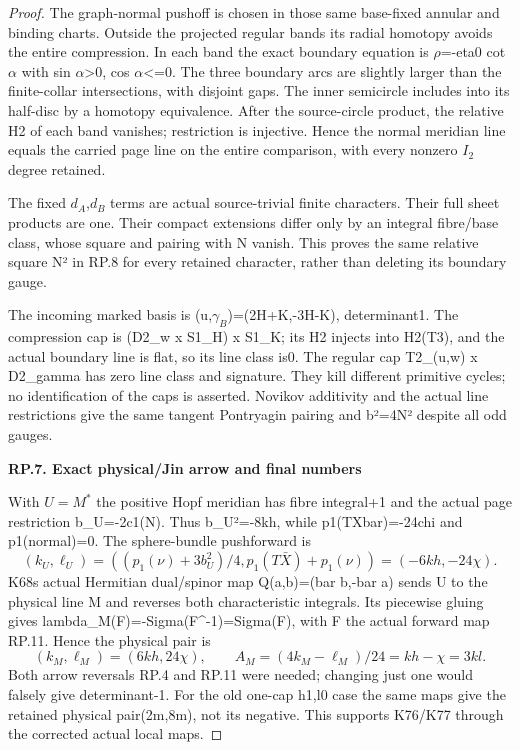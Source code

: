 \begin{proof}
The graph-normal pushoff is chosen in those same base-fixed annular
and binding charts. Outside the projected regular bands its radial
homotopy avoids the entire compression. In each band the exact boundary
equation is \(\rho\)=-eta0 cot \(\alpha\) with sin \(\alpha\)\textgreater0, cos \(\alpha\)\textless=0. The
three boundary arcs are slightly larger than the finite-collar
intersections, with disjoint gaps. The inner semicircle includes into
its half-disc by a homotopy equivalence. After the source-circle product,
the relative H2 of each band vanishes; restriction is injective. Hence
the normal meridian line equals the carried page line on the entire
comparison, with every nonzero \(I_2\) degree retained.

The fixed \(d_A\),\(d_B\) terms are actual source-trivial finite characters.
Their full sheet products are one. Their compact extensions differ
only by an integral fibre/base class, whose square and pairing with
N vanish. This proves the same relative square N² in RP.8 for every
retained character, rather than deleting its boundary gauge.

The incoming marked basis is (u,\(\gamma_B\))=(2H+K,-3H-K), determinant1.
The compression cap is (D2\_w x S1\_H) x S1\_K; its H2 injects into
H2(T3), and the actual boundary line is flat, so its line class is0.
The regular cap T2\_(u,w) x D2\_gamma has zero line class and signature.
They kill different primitive cycles; no identification of the caps
is asserted. Novikov additivity and the actual line restrictions give
the same tangent Pontryagin pairing and b²=4N² despite all odd gauges.

\par

\medskip\noindent\textbf{RP.7. Exact physical/Jin arrow and final numbers}

\par\nobreak

With \(U=M^*\) the positive Hopf meridian has fibre integral+1 and the
actual page restriction b\_U=-2c1(N). Thus b\_U²=-8kh, while
p1(TXbar)=-24chi and p1(normal)=0. The sphere-bundle pushforward is
\[
(k_U,\ell_U)=((p_1(\nu)+3b_U^2)/4, p_1(T\bar X)+p_1(\nu))
                  =(-6kh,-24\chi).
\tag{RP.19}
\]
K68\textquotesingle s actual Hermitian dual/spinor map Q(a,b)=(bar b,-bar a) sends
U to the physical line M and reverses both characteristic integrals.
Its piecewise gluing gives lambda\_M(F)=-Sigma(F\^{}-1)=Sigma(F), with F
the actual forward map RP.11. Hence the physical pair is
\[
(k_M,\ell_M)=(6kh,24\chi),\qquad
A_M=(4k_M-\ell_M)/24=kh-\chi=3kl.
\tag{RP.20}
\]
Both arrow reversals RP.4 and RP.11 were needed; changing just one
would falsely give determinant-1. For the old one-cap h1,l0 case the
same maps give the retained physical pair(2m,8m), not its negative.
This supports K76/K77 through the corrected actual local maps.

\qedhere
\end{proof}
